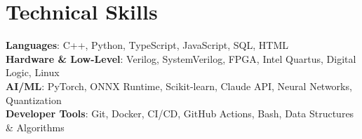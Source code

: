 \documentclass[letterpaper,11pt]{article}
\begin{document}
\section{Technical Skills}
 \begin{itemize}[leftmargin=0.15in, label={}]
    \small{\item{
     \textbf{Languages}{: C++, Python, TypeScript, JavaScript, SQL, HTML} \\
     \textbf{Hardware \& Low-Level}{: Verilog, SystemVerilog, FPGA, Intel Quartus, Digital Logic, Linux} \\
     \textbf{AI/ML}{: PyTorch, ONNX Runtime, Scikit-learn, Claude API, Neural Networks, Quantization} \\
     \textbf{Developer Tools}{: Git, Docker, CI/CD, GitHub Actions, Bash, Data Structures \& Algorithms} \\
    }}
 \end{itemize}

\end{document}
